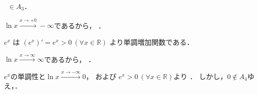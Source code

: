 \documentclass[uplatex,11pt]{jsarticle}
\def\shoumon#1{\vspace{1em}\noindent\ovalbox{\textsf{ #1 }}}
\begin{document}
\shoumon{(3)}

\ $\in A_3$．

$\ln x \xrightarrow{x \rightarrow +0} -\infty$であるから，
．


\shoumon{(4)}

$e^x$ は $(e^x)' = e^x > 0 \ (\forall x \in \mathbb{R})$ より単調増加関数である．

$\ln x \xrightarrow{x \rightarrow \infty} \infty$であるから，
．

$e^x$の単調性と$\ln x \xrightarrow{x \rightarrow -\infty} 0$，
および
$e^x > 0 \ (\forall x \in \mathbb{R})$より
．
しかし，$0 \not\in A_4$ゆえ，．

\newpage
\section{}
\end{document}

